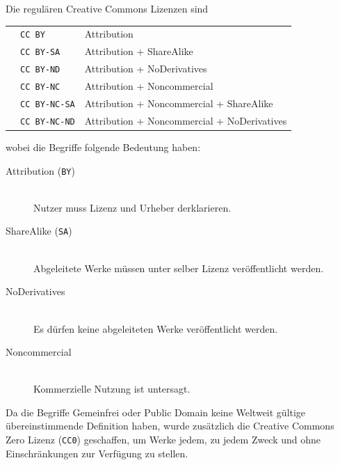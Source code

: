 Die regulären Creative Commons Lizenzen sind

\begin{tabular}{ c l l }
  & \texttt{CC BY} & Attribution \\
  & \texttt{CC BY-SA} & Attribution + ShareAlike \\
  & \texttt{CC BY-ND} & Attribution + NoDerivatives \\
  & \texttt{CC BY-NC} & Attribution + Noncommercial \\
  & \texttt{CC BY-NC-SA} & Attribution + Noncommercial + ShareAlike \\
  & \texttt{CC BY-NC-ND} &  Attribution + Noncommercial + NoDerivatives
\end{tabular}

wobei die Begriffe folgende Bedeutung haben:
\begin{description}
  \item[Attribution (\texttt{BY})] \mbox{} \\ Nutzer muss Lizenz und Urheber
    derklarieren.
  \item[ShareAlike (\texttt{SA})] \mbox{} \\ Abgeleitete Werke müssen unter
    selber Lizenz veröffentlicht werden.
  \item[NoDerivatives] \mbox{} \\ Es dürfen keine abgeleiteten Werke
    veröffentlicht werden.
  \item[Noncommercial] \mbox{} \\ Kommerzielle Nutzung ist untersagt.
\end{description}

Da die Begriffe Gemeinfrei oder Public Domain keine Weltweit gültige
übereinstimmende Definition haben, wurde zusätzlich die Creative Commons Zero
Lizenz (\texttt{CC0}) geschaffen, um Werke jedem, zu jedem Zweck und ohne Einschränkungen
zur Verfügung zu stellen.

